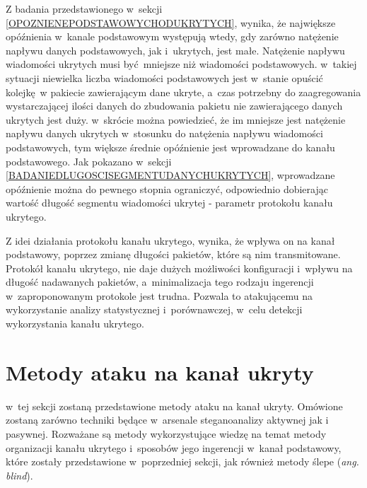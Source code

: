 \documentclass[a4paper, twoside, 12pt]{report}
\begin{document}
        Z badania przedstawionego w~sekcji \ref{OPOZNIENEPODSTAWOWYCHODUKRYTYCH},
        wynika, że największe opóźnienia w~kanale podstawowym
        występują wtedy, gdy zarówno natężenie napływu danych podstawowych, jak i~ukrytych, jest małe.
        Natężenie napływu wiadomości ukrytych musi być mniejsze niż wiadomości podstawowych.
        w~takiej sytuacji niewielka liczba wiadomości podstawowych jest w~stanie
        opuścić kolejkę w pakiecie zawierającym dane ukryte, a~czas potrzebny do
        zaagregowania wystarczającej ilości danych do zbudowania pakietu nie
        zawierającego danych ukrytych jest duży. w~skrócie można powiedzieć, że
        im mniejsze jest natężenie napływu danych ukrytych w~stosunku do natężenia
        napływu wiadomości podstawowych, tym większe średnie opóźnienie jest wprowadzane
        do kanału podstawowego. Jak pokazano w~sekcji \ref{BADANIEDLUGOSCISEGMENTUDANYCHUKRYTYCH},
        wprowadzane opóźnienie można do pewnego stopnia ograniczyć, odpowiednio
        dobierając wartość długość segmentu wiadomości ukrytej - parametr protokołu
        kanału ukrytego.

        Z idei działania protokołu kanału ukrytego, wynika, że wpływa on na kanał
        podstawowy, poprzez zmianę długości pakietów, które są nim transmitowane.
        Protokół kanału ukrytego, nie daje dużych możliwości konfiguracji i~wpływu
        na długość nadawanych pakietów, a~minimalizacja tego rodzaju ingerencji
        w~zaproponowanym protokole jest trudna. Pozwala to atakującemu
        na wykorzystanie analizy statystycznej i~porównawczej, w~celu detekcji
        wykorzystania kanału ukrytego.

    \section{Metody ataku na kanał ukryty}
       w~tej sekcji zostaną przedstawione metody ataku na kanał ukryty. Omówione
       zostaną zarówno techniki będące w~arsenale steganoanalizy aktywnej jak i
       pasywnej. Rozważane są metody wykorzystujące wiedzę na temat metody organizacji kanału ukrytego
       i~sposobów jego ingerencji w~kanał podstawowy, które zostały przedstawione w~poprzedniej sekcji,
       jak również metody ślepe (\emph{ang. blind}).
\end{document}
